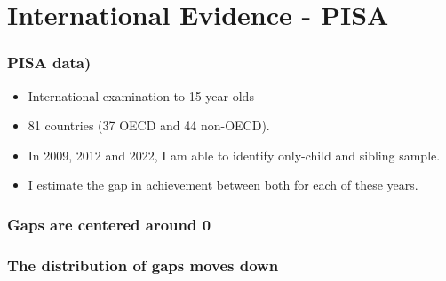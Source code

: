 \documentclass{beamer}
\begin{document}
\section{International Evidence - PISA}
    \begin{frame}
         \label{update_scott}
            \frametitle{PISA data)}
        \begin{itemize}
            \item International examination to 15 year olds
            \item 81 countries (37 OECD and 44 non-OECD).
            \item In 2009, 2012 and 2022, I am able to identify only-child and sibling sample.
            \item I estimate the gap in achievement between both for each of these years.
        \end{itemize}
    \end{frame}

\begin{frame}
    \label{update_scott}
    \frametitle{Gaps are centered around 0}
        {
    }
\end{frame}

\begin{frame}
    \label{update_scott}
    \frametitle{The distribution of gaps moves down}
        {
    }
\end{frame}
\end{document}
